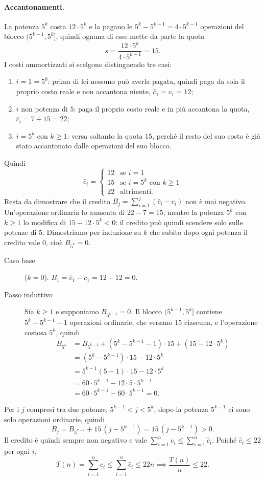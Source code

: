 \paragraph{Accantonamenti.}
La potenza $5^k$ costa $12 \cdot 5^k$ e la pagano le $5^k - 5^{k-1} = 4 \cdot 5^{k-1}$ operazioni del blocco $(5^{k-1}, 5^k]$, quindi ognuna di esse mette da parte la quota
\[
s = \frac{12 \cdot 5^k}{4 \cdot 5^{k-1}} = 15 .
\]
I costi ammortizzati si scelgono distinguendo tre casi:
\begin{enumerate}
    \item $i = 1 = 5^0$: prima di lei nessuno può averla pagata, quindi paga da sola il proprio costo reale e non accantona niente, $\hat{c}_1 = c_1 = 12$;
    \item $i$ non potenza di $5$: paga il proprio costo reale e in più accantona la quota, $\hat{c}_i = 7 + 15 = 22$;
    \item $i = 5^k$ con $k \ge 1$: versa soltanto la quota $15$, perché il resto del suo costo è già stato accantonato dalle operazioni del suo blocco.
\end{enumerate}
Quindi
\[
\hat{c}_i =
\begin{cases}
    12 & \text{se } i = 1 \\
    15 & \text{se } i = 5^k \text{ con } k \ge 1 \\
    22 & \text{altrimenti.}
\end{cases}
\]
Resta da dimostrare che il credito $B_j = \sum_{i=1}^{j} (\hat{c}_i - c_i)$ non è mai negativo. Un'operazione ordinaria lo aumenta di $22 - 7 = 15$, mentre la potenza $5^k$ con $k \ge 1$ lo modifica di $15 - 12 \cdot 5^k < 0$: il credito può quindi scendere solo sulle potenze di $5$. Dimostriamo per induzione su $k$ che subito dopo ogni potenza il credito vale $0$, cioè $B_{5^k} = 0$.
\begin{description}
    \item[Caso base] ($k = 0$). $B_1 = \hat{c}_1 - c_1 = 12 - 12 = 0$.
    \item[Passo induttivo] Sia $k \ge 1$ e supponiamo $B_{5^{k-1}} = 0$. Il blocco $(5^{k-1}, 5^k]$ contiene $5^k - 5^{k-1} - 1$ operazioni ordinarie, che versano $15$ ciascuna, e l'operazione costosa $5^k$, quindi
    \begin{align*}
        B_{5^k} &= B_{5^{k-1}} + (5^k - 5^{k-1} - 1) \cdot 15 + (15 - 12 \cdot 5^k) \\
        &= (5^k - 5^{k-1}) \cdot 15 - 12 \cdot 5^k \\
        &= 5^{k-1}(5 - 1) \cdot 15 - 12 \cdot 5^k \\
        &= 60 \cdot 5^{k-1} - 12 \cdot 5 \cdot 5^{k-1} \\
        &= 60 \cdot 5^{k-1} - 60 \cdot 5^{k-1} = 0 .
    \end{align*}
\end{description}
Per i $j$ compresi tra due potenze, $5^{k-1} < j < 5^k$, dopo la potenza $5^{k-1}$ ci sono solo operazioni ordinarie, quindi
\[
B_j = B_{5^{k-1}} + 15\,(j - 5^{k-1}) = 15\,(j - 5^{k-1}) > 0 .
\]
Il credito è quindi sempre non negativo e vale $\sum_{i=1}^{n} c_i \le \sum_{i=1}^{n} \hat{c}_i$. Poiché $\hat{c}_i \le 22$ per ogni $i$,
\[
T(n) = \sum_{i=1}^{n} c_i \le \sum_{i=1}^{n} \hat{c}_i \le 22n \implies \frac{T(n)}{n} \le 22 .
\]

